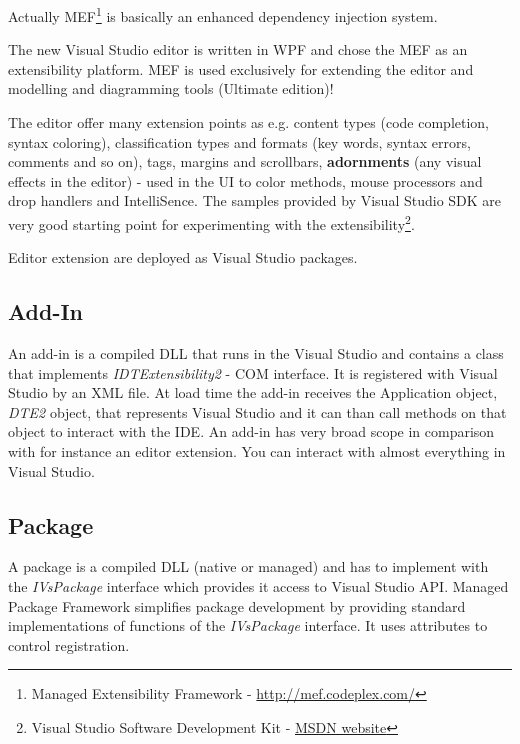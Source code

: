 Actually MEF\footnote{Managed Extensibility Framework - \href{http://mef.codeplex.com/}{http://mef.codeplex.com/} } 
is basically an enhanced dependency injection system. 

The new Visual Studio editor is written in WPF and chose the MEF as an extensibility platform. MEF is used exclusively for extending the editor and modelling and diagramming tools (Ultimate edition)!

The editor offer many extension points as e.g. content types (code completion, syntax coloring), classification types and formats (key words, syntax errors, comments and so on), tags, margins and scrollbars, \textbf{adornments} (any visual effects in the editor) - used in the UI to color methods, mouse processors and drop handlers and IntelliSence. The samples provided by Visual Studio SDK are very good starting point for experimenting with the extensibility\footnote{Visual Studio Software Development Kit - \href{http://msdn.microsoft.com/en-us/library/bb166441(v=VS.100).aspx}{MSDN website}}.

Editor extension are deployed as Visual Studio packages.

\subsection{Add-In}
An add-in is a compiled DLL that runs in the Visual Studio and contains a class that implements \textit{IDTExtensibility2} - COM interface. It is registered with Visual Studio by an XML file. At load time the add-in receives the Application object, \textit{DTE2} object, that represents Visual Studio and it can than call methods on that object to interact with the IDE. An add-in has very broad scope in comparison with for instance an editor extension. You can interact with almost everything in Visual Studio.

\subsection{Package}
A package is a compiled DLL (native or managed) and has to implement with the \textit{IVsPackage} interface which provides it access to Visual Studio API. Managed Package Framework simplifies package development by providing standard implementations of functions of the \textit{IVsPackage} interface. It uses attributes to control registration.

